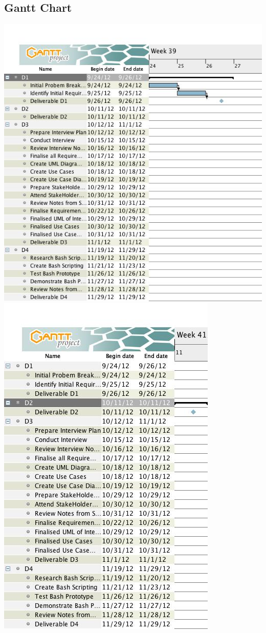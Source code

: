 \documentclass{l3deliverable}
\begin{document}
{\subsection{Gantt Chart}

\includegraphics[scale=0.7]{img/GANTTD1.jpg}\\
\includegraphics[scale=0.7]{img/GANTTD2.jpg}\\
}
\end{document}
